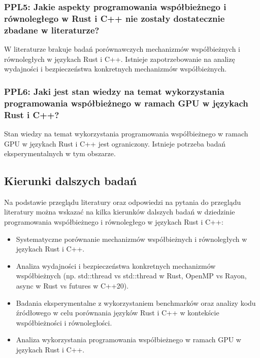 \subsubsection{PPL5: Jakie aspekty programowania współbieżnego i równoległego w Rust i C++ nie zostały dostatecznie zbadane w literaturze?}
W literaturze brakuje badań porównawczych mechanizmów współbieżnych i równoległych w językach Rust i C++. Istnieje zapotrzebowanie na analizę wydajności i bezpieczeństwa konkretnych mechanizmów współbieżnych.

\subsubsection{PPL6: Jaki jest stan wiedzy na temat wykorzystania programowania współbieżnego w ramach GPU w językach Rust i C++?}
Stan wiedzy na temat wykorzystania programowania współbieżnego w ramach GPU w językach Rust i C++ jest ograniczony. Istnieje potrzeba badań eksperymentalnych w tym obszarze.

\subsection{Kierunki dalszych badań}
Na podstawie przeglądu literatury oraz odpowiedzi na pytania do przeglądu literatury można wskazać na kilka kierunków dalszych badań w dziedzinie programowania współbieżnego i równoległego w językach Rust i C++:
\begin{itemize}
    \item Systematyczne porównanie mechanizmów współbieżnych i równoległych w językach Rust i C++.
    \item Analiza wydajności i bezpieczeństwa konkretnych mechanizmów współbieżnych (np. std::thread vs std::thread w Rust, OpenMP vs Rayon, async w Rust vs futures w C++20).
    \item Badania eksperymentalne z wykorzystaniem benchmarków oraz analizy kodu źródłowego w celu porównania języków Rust i C++ w kontekście współbieżności i równoległości.
    \item Analiza wykorzystania programowania współbieżnego w ramach GPU w językach Rust i C++.
\end{itemize}
